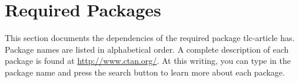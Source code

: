 \documentclass[12pt]{tlc-article}
\begin{document}
\clearpage
\section{Required Packages}
This section documents the dependencies of the required package tlc-article has.
Package names are listed in alphabetical order. A complete description of each
package is found at \url{http://www.ctan.org/}. At this writing, you can type in the
package name and press the search button to learn more about each package.



\csvreader[tlcPkgStyle, separator=pipe]{\tlcPkgFile}{}{\name & \description}
\end{document}
